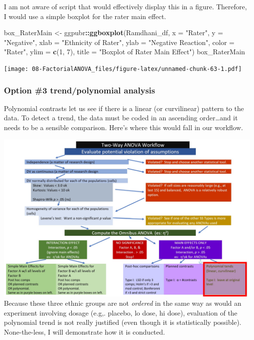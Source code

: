 \documentclass[
  11pt,
]{book}
\newenvironment{Shaded}{\begin{snugshade}}{\end{snugshade}}
\newcommand{\AttributeTok}[1]{\textcolor[rgb]{0.27,0.27,0.27}{#1}}
\newcommand{\DecValTok}[1]{\textcolor[rgb]{0.06,0.06,0.06}{#1}}
\newcommand{\FunctionTok}[1]{\textcolor[rgb]{0.27,0.27,0.27}{\textbf{#1}}}
\newcommand{\NormalTok}[1]{#1}
\newcommand{\OtherTok}[1]{\textcolor[rgb]{0.37,0.37,0.37}{#1}}
\newcommand{\SpecialCharTok}[1]{\textcolor[rgb]{0.43,0.43,0.43}{\textbf{#1}}}
\newcommand{\StringTok}[1]{\textcolor[rgb]{0.5,0.5,0.5}{#1}}
\begin{document}
I am not aware of script that would effectively display this in a figure. Therefore, I would use a simple boxplot for the rater main effect.

\begin{Shaded}
\begin{Highlighting}[]
\NormalTok{box\_RaterMain }\OtherTok{\textless{}{-}}\NormalTok{ ggpubr}\SpecialCharTok{::}\FunctionTok{ggboxplot}\NormalTok{(Ramdhani\_df, }\AttributeTok{x =} \StringTok{"Rater"}\NormalTok{, }\AttributeTok{y =} \StringTok{"Negative"}\NormalTok{,}
    \AttributeTok{xlab =} \StringTok{"Ethnicity of Rater"}\NormalTok{, }\AttributeTok{ylab =} \StringTok{"Negative Reaction"}\NormalTok{, }\AttributeTok{color =} \StringTok{"Rater"}\NormalTok{,}
    \AttributeTok{ylim =} \FunctionTok{c}\NormalTok{(}\DecValTok{1}\NormalTok{, }\DecValTok{7}\NormalTok{), }\AttributeTok{title =} \StringTok{"Boxplot of Rater Main Effect"}\NormalTok{)}
\NormalTok{box\_RaterMain}
\end{Highlighting}
\end{Shaded}

\texttt{[image: 08-FactorialANOVA\_files/figure-latex/unnamed-chunk-63-1.pdf]}

\hypertarget{option-3-trendpolynomial-analysis}{%
\subsubsection{Option \#3 trend/polynomial analysis}\label{option-3-trendpolynomial-analysis}}

Polynomial contrasts let us see if there is a linear (or curvilinear) pattern to the data. To detect a trend, the data must be coded in an ascending order\ldots and it needs to be a sensible comparison. Here's where this would fall in our workflow.

\includegraphics{images/factorial/wfMain_Poly.jpg} Because these three ethnic groups are not \emph{ordered} in the same way as would an experiment involving dosage (e.g,. placebo, lo dose, hi dose), evaluation of the polynomial trend is not really justified (even though it is statistically possible). None-the-less, I will demonstrate how it is conducted.
\end{document}
